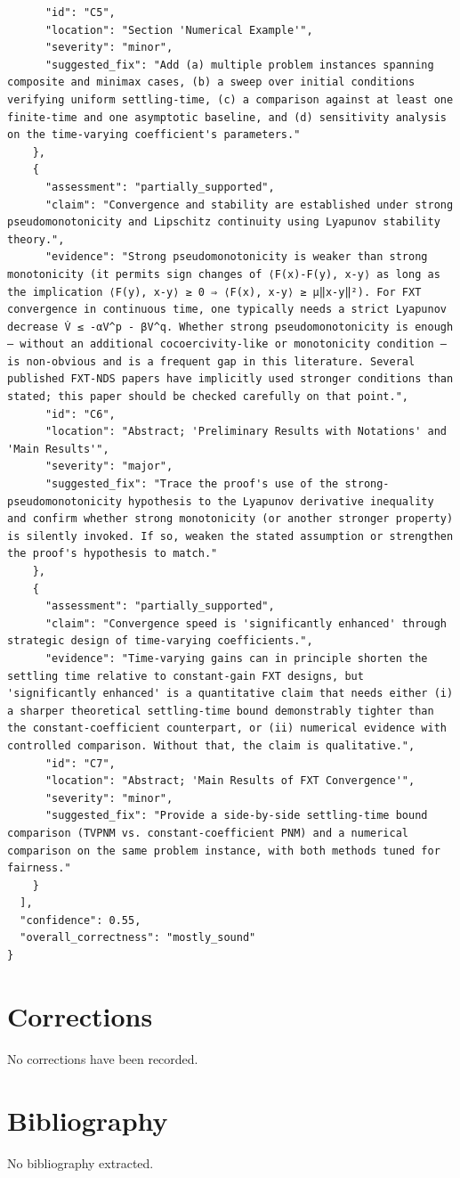 \documentclass[11pt]{article}
\begin{document}
\begin{verbatim}
      "id": "C5",
      "location": "Section 'Numerical Example'",
      "severity": "minor",
      "suggested_fix": "Add (a) multiple problem instances spanning composite and minimax cases, (b) a sweep over initial conditions verifying uniform settling-time, (c) a comparison against at least one finite-time and one asymptotic baseline, and (d) sensitivity analysis on the time-varying coefficient's parameters."
    },
    {
      "assessment": "partially_supported",
      "claim": "Convergence and stability are established under strong pseudomonotonicity and Lipschitz continuity using Lyapunov stability theory.",
      "evidence": "Strong pseudomonotonicity is weaker than strong monotonicity (it permits sign changes of ⟨F(x)-F(y), x-y⟩ as long as the implication ⟨F(y), x-y⟩ ≥ 0 ⇒ ⟨F(x), x-y⟩ ≥ µ‖x-y‖²). For FXT convergence in continuous time, one typically needs a strict Lyapunov decrease V̇ ≤ -αV^p - βV^q. Whether strong pseudomonotonicity is enough — without an additional cocoercivity-like or monotonicity condition — is non-obvious and is a frequent gap in this literature. Several published FXT-NDS papers have implicitly used stronger conditions than stated; this paper should be checked carefully on that point.",
      "id": "C6",
      "location": "Abstract; 'Preliminary Results with Notations' and 'Main Results'",
      "severity": "major",
      "suggested_fix": "Trace the proof's use of the strong-pseudomonotonicity hypothesis to the Lyapunov derivative inequality and confirm whether strong monotonicity (or another stronger property) is silently invoked. If so, weaken the stated assumption or strengthen the proof's hypothesis to match."
    },
    {
      "assessment": "partially_supported",
      "claim": "Convergence speed is 'significantly enhanced' through strategic design of time-varying coefficients.",
      "evidence": "Time-varying gains can in principle shorten the settling time relative to constant-gain FXT designs, but 'significantly enhanced' is a quantitative claim that needs either (i) a sharper theoretical settling-time bound demonstrably tighter than the constant-coefficient counterpart, or (ii) numerical evidence with controlled comparison. Without that, the claim is qualitative.",
      "id": "C7",
      "location": "Abstract; 'Main Results of FXT Convergence'",
      "severity": "minor",
      "suggested_fix": "Provide a side-by-side settling-time bound comparison (TVPNM vs. constant-coefficient PNM) and a numerical comparison on the same problem instance, with both methods tuned for fairness."
    }
  ],
  "confidence": 0.55,
  "overall_correctness": "mostly_sound"
}
\end{verbatim}

\section*{Corrections}
No corrections have been recorded.

\section*{Bibliography}
No bibliography extracted.

% 
% 
\end{document}
